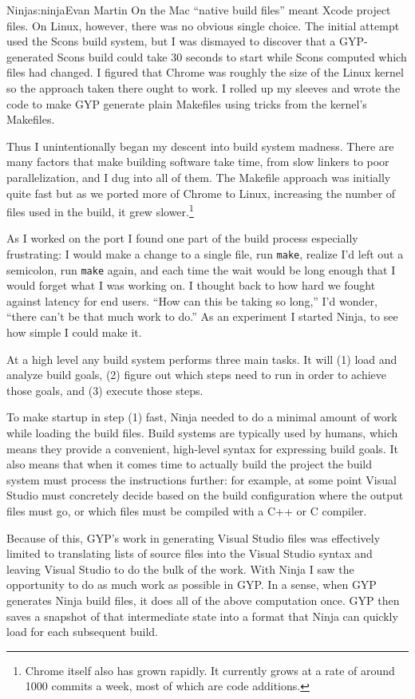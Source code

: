 \begin{aosachapter}{Ninja}{s:ninja}{Evan Martin}
On the Mac ``native build files'' meant Xcode project files. On Linux,
however, there was no obvious single choice. The initial attempt used
the Scons build system, but I was dismayed to discover that a
GYP-generated Scons build could take 30 seconds to start while Scons
computed which files had changed. I figured that Chrome was roughly the
size of the Linux kernel so the approach taken there ought to work. I
rolled up my sleeves and wrote the code to make GYP generate plain
Makefiles using tricks from the kernel's Makefiles.

Thus I unintentionally began my descent into build system madness. There
are many factors that make building software take time, from slow
linkers to poor parallelization, and I dug into all of them. The
Makefile approach was initially quite fast but as we ported more of
Chrome to Linux, increasing the number of files used in the build, it
grew slower.\footnote{Chrome itself also has grown rapidly. It currently
  grows at a rate of around 1000 commits a week, most of which are code
  additions.}

As I worked on the port I found one part of the build process especially
frustrating: I would make a change to a single file, run \texttt{make},
realize I'd left out a semicolon, run \texttt{make} again, and each time
the wait would be long enough that I would forget what I was working on.
I thought back to how hard we fought against latency for end users.
``How can this be taking so long,'' I'd wonder, ``there can't be that
much work to do.'' As an experiment I started Ninja, to see how simple I
could make it.


At a high level any build system performs three main tasks. It will (1)
load and analyze build goals, (2) figure out which steps need to run in
order to achieve those goals, and (3) execute those steps.

To make startup in step (1) fast, Ninja needed to do a minimal amount of
work while loading the build files. Build systems are typically used by
humans, which means they provide a convenient, high-level syntax for
expressing build goals. It also means that when it comes time to
actually build the project the build system must process the
instructions further: for example, at some point Visual Studio must
concretely decide based on the build configuration where the output
files must go, or which files must be compiled with a C++ or C compiler.

Because of this, GYP's work in generating Visual Studio files was
effectively limited to translating lists of source files into the Visual
Studio syntax and leaving Visual Studio to do the bulk of the work. With
Ninja I saw the opportunity to do as much work as possible in GYP. In a
sense, when GYP generates Ninja build files, it does all of the above
computation once. GYP then saves a snapshot of that intermediate state
into a format that Ninja can quickly load for each subsequent build.


\end{aosachapter}
